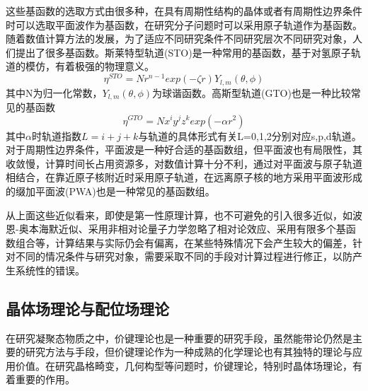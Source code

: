 这些基函数的选取方式由很多种，在具有周期性结构的晶体或者有周期性边界条件时可以选取平面波作为基函数，在研究分子问题时可以采用原子轨道作为基函数。随着数值计算方法的发展，为了适应不同研究条件不同研究层次不同研究对象，人们提出了很多基函数。斯莱特型轨道(STO)是一种常用的基函数，基于对氢原子轨道的模仿，有着极强的物理意义。
\begin{equation}
    \label{sto}
    \eta^{STO}=Nr^{n-1}exp(-\zeta r)Y_{l,m}(\theta,\phi)
\end{equation}
其中N为归一化常数，$Y_{l,m}(\theta,\phi)$为球谐函数。高斯型轨道(GTO)也是一种比较常见的基函数
\begin{equation}
    \label{gto}
    \eta^{GTO}=Nx^{i}y^{j}z^{k}exp(-\alpha r^{2})
\end{equation}
其中$\alpha$时轨道指数$L=i+j+k$与轨道的具体形式有关L=0,1,2分别对应s,p,d轨道。对于周期性边界条件，平面波是一种好合适的基函数组，但平面波也有局限性，其收敛慢，计算时间长占用资源多，对数值计算十分不利，通过对平面波与原子轨道相结合，在靠近原子核附近时采用原子轨道，在远离原子核的地方采用平面波形成的缀加平面波(PWA)也是一种常见的基函数组。

从上面这些近似看来，即使是第一性原理计算，也不可避免的引入很多近似，如波恩-奥本海默近似、采用非相对论量子力学忽略了相对论效应、采用有限多个基函数组合等，计算结果与实际仍会有偏离，在某些特殊情况下会产生较大的偏差，针对不同的情况条件与研究对象，需要采取不同的手段对计算过程进行修正，以防产生系统性的错误。

\subsection{晶体场理论与配位场理论}
在研究凝聚态物质之中，价键理论也是一种重要的研究手段，虽然能带论仍然是主要的研究方法与手段，但价键理论作为一种成熟的化学理论也有其独特的理论与应用价值。在研究晶格畸变，几何构型等问题时，价键理论，特别时晶体场理论，有着重要的作用。

